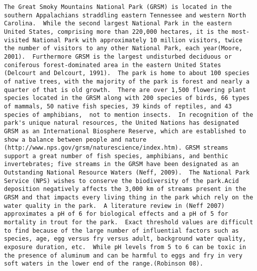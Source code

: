 \begin{verbatim}
The Great Smoky Mountains National Park (GRSM) is located in the southern Appalachians straddling eastern Tennessee and western North Carolina.  While the second largest National Park in the eastern United States, comprising more than 220,000 hectares, it is the most-visited National Park with approximately 10 million visitors, twice the number of visitors to any other National Park, each year(Moore, 2001).  Furthermore GRSM is the largest undisturbed deciduous or coniferous forest-dominated area in the eastern United States (Delcourt and Delcourt, 1991).  The park is home to about 100 species of native trees, with the majority of the park is forest and nearly a quarter of that is old growth.  There are over 1,500 flowering plant species located in the GRSM along with 200 species of birds, 66 types of mammals, 50 native fish species, 39 kinds of reptiles, and 43 species of amphibians,  not to mention insects.  In recognition of the park's unique natural resources, the United Nations has designated GRSM as an International Biosphere Reserve, which are established to show a balance between people and nature (http://www.nps.gov/grsm/naturescience/index.htm). GRSM streams support a great number of fish species, amphibians, and benthic invertebrates; five streams in the GRSM have been designated as an Outstanding National Resource Waters (Neff, 2009).  The National Park Service (NPS) wishes to conserve the biodiversity of the park.Acid deposition negatively affects the 3,000 km of streams present in the GRSM and that impacts every living thing in the park which rely on the water quality in the park.  A literature review in (Neff 2007) approximates a pH of 6 for biological effects and a pH of 5 for mortality in trout for the park.  Exact threshold values are difficult to find because of the large number of influential factors such as species, age, egg versus fry versus adult, background water quality, exposure duration, etc.  While pH levels from 5 to 6 can be toxic in the presence of aluminum and can be harmful to eggs and fry in very soft waters in the lower end of the range.(Robinson 08).  

\end{verbatim}
